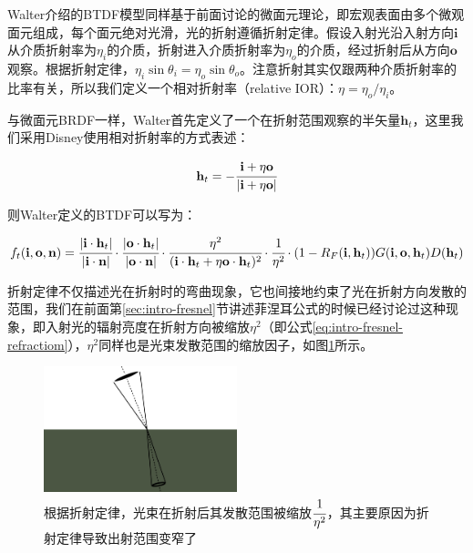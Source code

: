 Walter介绍的BTDF模型同样基于前面讨论的微面元理论，即宏观表面由多个微观面元组成，每个面元绝对光滑，光的折射遵循折射定律。假设入射光沿入射方向$\mathbf{i}$从介质折射率为$\eta_i$的介质，折射进入介质折射率为$\eta_o$的介质，经过折射后从方向$\mathbf{o}$观察。根据折射定律，$\eta_i \sin\theta_i=\eta_o \sin\theta_o$。注意折射其实仅跟两种介质折射率的比率有关，所以我们定义一个相对折射率（relative IOR）：$\eta=\eta_o/\eta_i$。

与微面元BRDF一样，Walter首先定义了一个在折射范围观察的半矢量$\mathbf{h}_t$，这里我们采用Disney使用相对折射率的方式表述：

\begin{equation}
	\mathbf{h}_t=- \cfrac{\mathbf{i}+\eta\mathbf{o}}{|\mathbf{i}+\eta\mathbf{o}|}
\end{equation}

\noindent 则Walter定义的BTDF可以写为：

\begin{equation}
	f_t(\mathbf{i},\mathbf{o},\mathbf{n})= \cfrac{|\mathbf{i}\cdot\mathbf{h}_t|}{|\mathbf{i}\cdot\mathbf{n}|}\cdot \cfrac{|\mathbf{o}\cdot\mathbf{h}_t|}{|\mathbf{o}\cdot\mathbf{n}|}\cdot \cfrac{\eta^2}{(\mathbf{i}\cdot\mathbf{h}_t+\eta\mathbf{o}\cdot\mathbf{h}_t)^2}\cdot \cfrac{1}{\eta^2}\cdot (1-R_F(\mathbf{i},\mathbf{h}_t))G(\mathbf{i},\mathbf{o},\mathbf{h}_t)D(\mathbf{h}_t)
\end{equation}

折射定律不仅描述光在折射时的弯曲现象，它也间接地约束了光在折射方向发散的范围，我们在前面第\ref{sec:intro-fresnel}节讲述菲涅耳公式的时候已经讨论过这种现象，即入射光的辐射亮度在折射方向被缩放$\eta^2$（即公式\ref{eq:intro-fresnel-refractiom}），$\eta^2$同样也是光束发散范围的缩放因子，如图\ref{f:intro-fresnel-fraction}所示。

\begin{figure}
	\sidecaption
\includegraphics[width=0.5\textwidth]{figures/intro/refraction}
	\caption{根据折射定律，光束在折射后其发散范围被缩放$ \cfrac{1}{\eta^2}$，其主要原因为折射定律导致出射范围变窄了}
	\label{f:intro-fresnel-fraction}
\end{figure}

